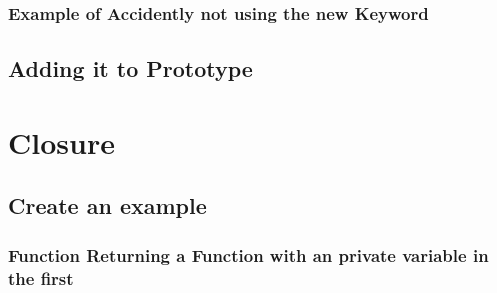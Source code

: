 \documentclass {amsart}
\begin{document}
		\subsubsection {Example of Accidently not using the {\bf new} Keyword}
	\subsection{Adding it to Prototype}

\section{Closure}
	\subsection{Create an example}
		\subsubsection{Function Returning a Function with an private variable in the first}
\end{document}
